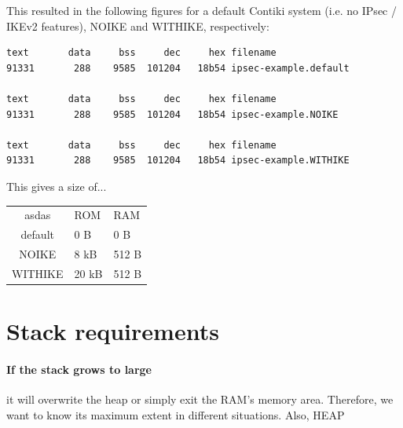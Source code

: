 \documentclass[final,a4paper,twoside,11pt,onecolumn]{report}
\begin{document}
This resulted in the following figures for a default Contiki system (i.e. no IPsec / IKEv2 features), NOIKE and WITHIKE, respectively:
\begin{verbatim}
text	   data	    bss	    dec	    hex	filename
91331	    288	   9585	 101204	  18b54	ipsec-example.default

text	   data	    bss	    dec	    hex	filename
91331	    288	   9585	 101204	  18b54	ipsec-example.NOIKE

text	   data	    bss	    dec	    hex	filename
91331	    288	   9585	 101204	  18b54	ipsec-example.WITHIKE
\end{verbatim}

This gives a size of...

\begin{tabular}{|c|l|l}
asdas       & ROM    & RAM       \\
default     & 0 B    & 0 B        \\
NOIKE       & 8 kB   & 512 B     \\
WITHIKE     & 20 kB  & 512 B
\end{tabular}


% 
% 
% 
% 



\section{Stack requirements}
\paragraph{If the stack grows to large} it will overwrite the heap or simply exit the RAM's memory area. Therefore, we want to know its maximum extent in different situations. Also, HEAP
\end{document}
